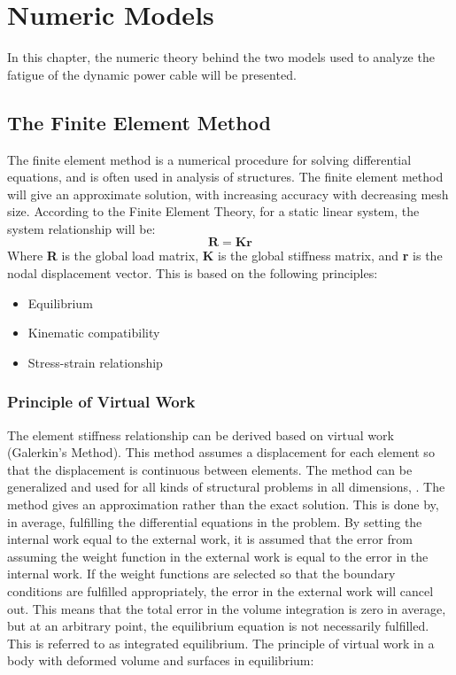 \chapter{Numeric Models}
\label{chap:numeric}
In this chapter, the numeric theory behind the two models used to analyze the fatigue of the dynamic power cable will be presented.

\section{The Finite Element Method}
The finite element method is a numerical procedure for solving differential equations, and is often used in analysis of structures. The finite element method will give an approximate solution, with increasing accuracy with decreasing mesh size. According to the Finite Element Theory, for a static linear system, the system relationship will be:
\begin{equation}
    \boldsymbol{R}= \boldsymbol{K}\boldsymbol{r}
\end{equation}
Where \textbf{R} is the global load matrix, \textbf{K} is the global stiffness matrix, and \textbf{r} is the nodal displacement vector.\newline
\newline
This is based on the following principles:
\begin{itemize}
    \item Equilibrium
    \item Kinematic compatibility
    \item Stress-strain relationship
\end{itemize}
 \cite{moan2003}
\subsection{Principle of Virtual Work}
The element stiffness relationship can be derived based on virtual work (Galerkin's Method). This method assumes a displacement for each element so that the displacement is continuous between elements. The method can be generalized and used for all kinds of structural problems in all dimensions, \cite{moan2003}. The method gives an approximation rather than the exact solution. This is done by,  in average, fulfilling the differential equations in the problem. By setting the internal work equal to the external work, it is assumed that the error from assuming the weight function in the external work is equal to the error in the internal work. If the weight functions are selected so that the boundary conditions are fulfilled appropriately, the error in the external work will cancel out. This means that the total error in the volume integration is zero in average, but at an arbitrary point, the equilibrium equation is not necessarily fulfilled. This is referred to as integrated equilibrium. The principle of virtual work in a body with deformed volume and surfaces in equilibrium:   

